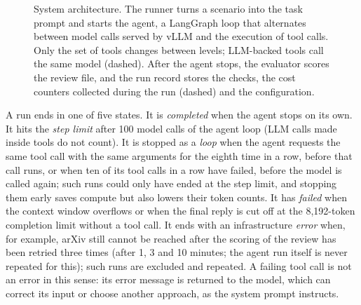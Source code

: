 \begin{figure}[t]
  \caption{System architecture. The runner turns a scenario into the task prompt and starts the agent, a LangGraph loop that alternates between model calls served by vLLM and the execution of tool calls. Only the set of tools changes between levels; LLM-backed tools call the same model (dashed). After the agent stops, the evaluator scores the review file, and the run record stores the checks, the cost counters collected during the run (dashed) and the configuration.}
  \label{fig:architecture}
\end{figure}

A run ends in one of five states. It is \emph{completed} when the agent stops on its own. It hits the \emph{step limit} after 100 model calls of the agent loop (LLM calls made inside tools do not count). It is stopped as a \emph{loop} when the agent requests the same tool call with the same arguments for the eighth time in a row, before that call runs, or when ten of its tool calls in a row have failed, before the model is called again; such runs could only have ended at the step limit, and stopping them early saves compute but also lowers their token counts. It has \emph{failed} when the context window overflows or when the final reply is cut off at the 8{,}192-token completion limit without a tool call. It ends with an infrastructure \emph{error} when, for example, arXiv still cannot be reached after the scoring of the review has been retried three times (after 1, 3 and 10 minutes; the agent run itself is never repeated for this); such runs are excluded and repeated. A failing tool call is not an error in this sense: its error message is returned to the model, which can correct its input or choose another approach, as the system prompt instructs.

